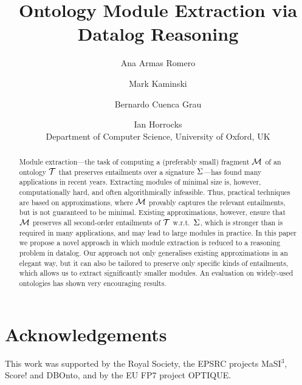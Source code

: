 \documentclass[letterpaper]{article}
\begin{document}
% 
\title{Ontology Module Extraction via Datalog Reasoning} 
\author{Ana Armas Romero \and Mark Kaminski \and Bernardo Cuenca Grau \and Ian Horrocks\\
Department of Computer Science, University of Oxford, UK}
\maketitle
\begin{abstract}
Module extraction---the task of computing
a (preferably small) fragment $\M$ of an ontology $\T$ that preserves
entailments over a 
signature $\S$---has found many
applications in recent years. Extracting
modules of minimal size is, however, computationally hard,
and often algorithmically infeasible. Thus, practical techniques
are based on approximations, where $\M$
provably captures the relevant entailments, but is not
guaranteed to be minimal. Existing approximations, however,
ensure that $\M$ preserves all  second-order entailments of $\T$ w.r.t.\ $\S$, 
which is stronger than is required in
many applications, and may lead to 
large modules in practice. 
In this paper we propose
a novel approach in which module extraction is reduced to
a reasoning problem in datalog. Our approach not only generalises
existing approximations in an elegant way, but it
can also be tailored to preserve only specific kinds of entailments,
which allows
us to extract significantly smaller modules. An evaluation on 
widely-used ontologies has shown very encouraging results.
\end{abstract}
 



  



\section*{Acknowledgements}
This work was supported by the Royal Society, the EPSRC projects MaSI$^3$, Score! and DBOnto, 
and by the EU FP7 project \mbox{OPTIQUE}.



 
 \clearpage
 \onecolumn
 \appendix
 
 
\end{document}
